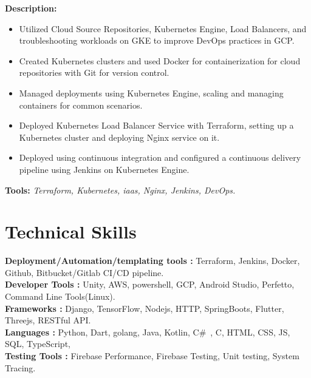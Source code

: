\documentclass[letterpaper,11pt]{article}
\newcommand{\resumeItem}[1]{
  \item\small{
    {#1 \vspace{-2pt}}
  }
}
\newcommand{\resumeItemListStart}{\begin{itemize}}
\newcommand{\resumeItemListEnd}{\end{itemize}\vspace{-5pt}}
\begin{document}
          \textbf{Description:}
          \vspace{-5pt}
          \resumeItemListStart
            \resumeItem{Utilized Cloud Source Repositories, Kubernetes Engine, Load Balancers, and troubleshooting workloads on GKE to improve DevOps practices in GCP.}
            \resumeItem{Created Kubernetes clusters and used Docker for containerization for cloud repositories with Git for version control.}
            \resumeItem{Managed deployments using Kubernetes Engine, scaling and managing containers for common scenarios.}
            \resumeItem{Deployed Kubernetes Load Balancer Service with Terraform, setting up a Kubernetes cluster and deploying Nginx service on it.}
            \resumeItem{Deployed using continuous integration and configured a continuous delivery pipeline using Jenkins on Kubernetes Engine.}
          \resumeItemListEnd 
          \vspace{-12pt}
          \textbf{Tools:}\emph{
                Terraform, Kubernetes, iaas, Nginx, Jenkins, DevOps.}
\vspace{-15pt}
\section{Technical Skills}
\vspace{-5pt}
 \begin{itemize}[leftmargin=0.15in, label={}]
    \small{\item{
     \textbf{Deployment/Automation/templating tools : }{Terraform, Jenkins, Docker, Github, Bitbucket/Gitlab CI/CD pipeline.} \\
     \textbf{Developer Tools : }{Unity, AWS, powershell, GCP, Android Studio, Perfetto, Command Line Tools(Linux).}  \\
     \textbf{Frameworks : }{Django, TensorFlow, Nodejs, HTTP, SpringBoots, Flutter, Threejs, RESTful API.}\\
     \textbf{Languages : }{ Python, Dart, golang, Java, Kotlin, C\#\ , C, HTML, CSS, JS, SQL, TypeScript, }\\
     \textbf{Testing Tools : }{Firebase Performance, Firebase Testing, Unit testing, System Tracing. }\\
    }}
 \end{itemize}
\vspace{-23pt}
\end{document}
